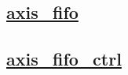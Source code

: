 \documentclass{article}
\begin{document}
  


  \subsection{\href{../files/axis_fifo-v.html}{axis\_fifo}}

  \subsection{\href{../files/axis_fifo_ctrl-v.html}{axis\_fifo\_ctrl}}
\end{document}
